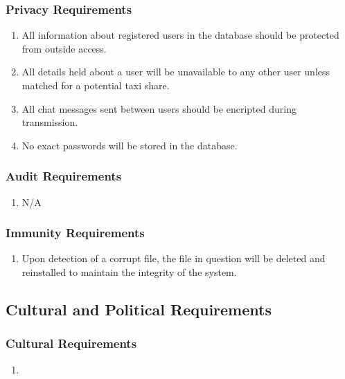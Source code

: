 \documentclass[]{article}
\begin{document}
\subsubsection{Privacy Requirements}
\label{ssub:privacy_requirements}
\begin{enumerate}[{SR}1. ]
	\item All information about registered users in the database should be protected from outside access.
	\item All details held about a user will be unavailable to any other user unless matched for a potential taxi share.
	\item All chat messages sent between users should be encripted during transmission.
	\item No exact passwords will be stored in the database.
\end{enumerate}

\subsubsection{Audit Requirements}
\label{ssub:audit_requirements}
\begin{enumerate}[{SR}1. ]
	\item N/A
\end{enumerate}

\subsubsection{Immunity Requirements}
\label{ssub:immunity_requirements}
\begin{enumerate}[{SR}1. ]
	\item Upon detection of a corrupt file, the file in question will be deleted and reinstalled to maintain the integrity of the system.
\end{enumerate}


\subsection{Cultural and Political Requirements}
\label{sub:cultural_and_political_requirements}

\subsubsection{Cultural Requirements}
\label{ssub:cultural_requirements}
\begin{enumerate}[{CP}1. ]
	\item 
\end{enumerate}
\end{document}
